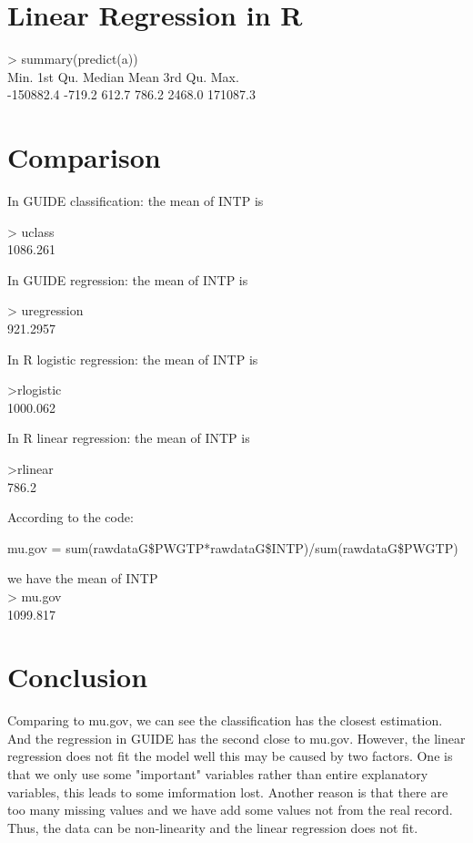 \documentclass[12pt]{article}
\begin{document}
\section{Linear Regression in R}
> summary(predict(a))\\
     Min.   1st Qu.    Median      Mean   3rd Qu.      Max. \\
-150882.4    -719.2     612.7     786.2    2468.0  171087.3\\ 
\section{Comparison}
In GUIDE classification: the mean of INTP is\\ 
\begin{center}
> uclass\\
1086.261\\
\end{center}
In GUIDE regression: the mean of INTP is\\
\begin{center}
> uregression\\
921.2957\\
\end{center}
In R logistic regression: the mean of INTP is\\
\begin{center}
>rlogistic\\
1000.062\\
\end{center}
In R linear regression: the mean of INTP is\\
\begin{center}
>rlinear\\
786.2\\
\end{center}
According to the code:\\
\begin{center}
mu.gov = sum(rawdataG\$PWGTP*rawdataG\$INTP)/sum(rawdataG\$PWGTP)
\end{center}
we have the mean of INTP\\
> mu.gov\\
1099.817\\
\section{Conclusion}
Comparing to mu.gov, we can see the classification has the closest estimation. And the regression in GUIDE has the second close to mu.gov. However, the linear regression does not fit the model well this may be caused by two factors. One is that we only use some "important" variables rather than entire explanatory variables, this leads to some imformation lost. Another reason is that there are too many missing values and we have add some values not from the real record. Thus, the data can be non-linearity and the linear regression does not fit.
\newpage
\appendixpage
\end{document}
